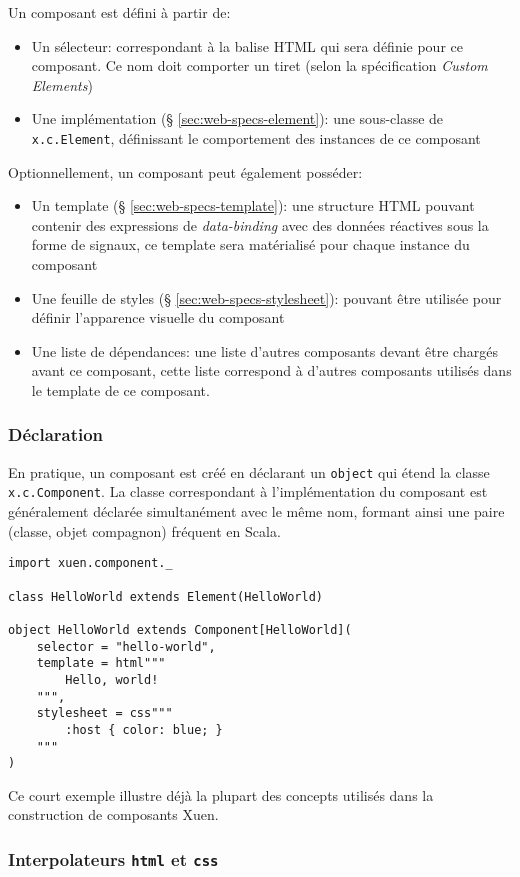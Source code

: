 Un composant est défini à partir de:
\begin{itemize}
	\item Un sélecteur: correspondant à la balise HTML qui sera définie pour ce composant. Ce nom doit comporter un tiret (selon la spécification \emph{Custom Elements})
	\item Une implémentation (§ \ref{sec:web-specs-element}): une sous-classe de \texttt{x.c.Element}, définissant le comportement des instances de ce composant
\end{itemize}
Optionnellement, un composant peut également posséder:
\begin{itemize}
	\item Un template (§ \ref{sec:web-specs-template}): une structure HTML pouvant contenir des expressions de \emph{data-binding} avec des données réactives sous la forme de signaux, ce template sera matérialisé pour chaque instance du composant 
	\item Une feuille de styles (§ \ref{sec:web-specs-stylesheet}): pouvant être utilisée pour définir l'apparence visuelle du composant
	\item Une liste de dépendances: une liste d'autres composants devant être chargés avant ce composant, cette liste correspond à d'autres composants utilisés dans le template de ce composant.
\end{itemize}

\subsubsection{Déclaration}
En pratique, un composant est créé en déclarant un \texttt{object} qui étend la classe \texttt{x.c.Component}. La classe correspondant à l'implémentation du composant est généralement déclarée simultanément avec le même nom, formant ainsi une paire (classe, objet compagnon) fréquent en Scala.

\begin{lstlisting}
import xuen.component._

class HelloWorld extends Element(HelloWorld)

object HelloWorld extends Component[HelloWorld](
	selector = "hello-world",
	template = html"""
		Hello, world!
	""",
	stylesheet = css"""
		:host { color: blue; }
	"""
)
\end{lstlisting}

Ce court exemple illustre déjà la plupart des concepts utilisés dans la construction de composants Xuen.

\subsubsection{Interpolateurs \texttt{html} et \texttt{css}}

